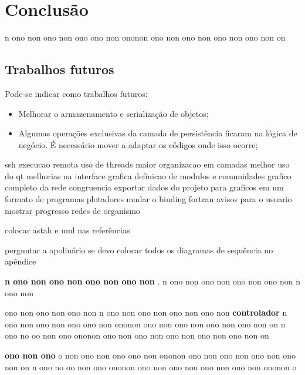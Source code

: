 \chapter{Conclusão} \label{cap:conclusao}

n ono non ono non ono ono non ononon ono non ono non ono non ono non on

\section{Trabalhos futuros}

Pode-se indicar como trabalhos futuros:

\begin{itemize}
  \item{Melhorar o armazenamento e serialização de objetos;}
  \item{Algumas operações exclusivas da camada de persistência ficaram na lógica de negócio. É necessário mover a adaptar os códigos onde isso ocorre;}
\end{itemize}

ssh execucao remota
uso de threads
maior organizacao em camadas
melhor uso do qt
melhorias na interface grafica
definicao de modulos e comunidades
grafico completo da rede
congruencia
exportar dados do projeto para graficos em um formato de programas plotadores
mudar o binding fortran
avisos para o usuario
mostrar progresso
redes de organismo

colocar astah e uml nas referências

perguntar a apolinário se devo colocar todos os diagramas de sequência no apêndice

\textbf{n ono non ono non ono non ono non }.
n ono non ono non ono non ono non n ono non 

ono non ono non ono non n ono non ono non ono non ono non 
\textbf{controlador} n ono non ono non ono ono non ononon ono non ono non ono non ono non on
n ono no oo non ono ononon ono  non ono non ono non ono non ono non on

\textbf{ono non ono}
o non ono non ono ono non ononon ono non ono non ono non ono non on
n ono no oo non ono ononon ono  non ono non ono non ono non ononon o 

